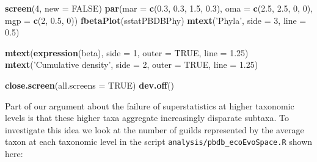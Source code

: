 \documentclass[]{article}
\newenvironment{Shaded}{\begin{snugshade}}{\end{snugshade}}
\newcommand{\KeywordTok}[1]{\textcolor[rgb]{0.13,0.29,0.53}{\textbf{#1}}}
\newcommand{\DataTypeTok}[1]{\textcolor[rgb]{0.13,0.29,0.53}{#1}}
\newcommand{\DecValTok}[1]{\textcolor[rgb]{0.00,0.00,0.81}{#1}}
\newcommand{\FloatTok}[1]{\textcolor[rgb]{0.00,0.00,0.81}{#1}}
\newcommand{\StringTok}[1]{\textcolor[rgb]{0.31,0.60,0.02}{#1}}
\newcommand{\OtherTok}[1]{\textcolor[rgb]{0.56,0.35,0.01}{#1}}
\newcommand{\NormalTok}[1]{#1}
\begin{document}
\begin{Shaded}
\begin{Highlighting}[]
\KeywordTok{screen}\NormalTok{(}\DecValTok{4}\NormalTok{, }\DataTypeTok{new =} \OtherTok{FALSE}\NormalTok{)}
\KeywordTok{par}\NormalTok{(}\DataTypeTok{mar =} \KeywordTok{c}\NormalTok{(}\FloatTok{0.3}\NormalTok{, }\FloatTok{0.3}\NormalTok{, }\FloatTok{1.5}\NormalTok{, }\FloatTok{0.3}\NormalTok{), }\DataTypeTok{oma =} \KeywordTok{c}\NormalTok{(}\FloatTok{2.5}\NormalTok{, }\FloatTok{2.5}\NormalTok{, }\DecValTok{0}\NormalTok{, }\DecValTok{0}\NormalTok{), }
    \DataTypeTok{mgp =} \KeywordTok{c}\NormalTok{(}\DecValTok{2}\NormalTok{, }\FloatTok{0.5}\NormalTok{, }\DecValTok{0}\NormalTok{))}
\KeywordTok{fbetaPlot}\NormalTok{(sstatPBDBPhy)}
\KeywordTok{mtext}\NormalTok{(}\StringTok{'Phyla'}\NormalTok{, }\DataTypeTok{side =} \DecValTok{3}\NormalTok{, }\DataTypeTok{line =} \FloatTok{0.5}\NormalTok{)}

\KeywordTok{mtext}\NormalTok{(}\KeywordTok{expression}\NormalTok{(beta), }\DataTypeTok{side =} \DecValTok{1}\NormalTok{, }\DataTypeTok{outer =} \OtherTok{TRUE}\NormalTok{, }\DataTypeTok{line =} \FloatTok{1.25}\NormalTok{)}
\KeywordTok{mtext}\NormalTok{(}\StringTok{'Cumulative density'}\NormalTok{, }\DataTypeTok{side =} \DecValTok{2}\NormalTok{, }\DataTypeTok{outer =} \OtherTok{TRUE}\NormalTok{, }\DataTypeTok{line =} \FloatTok{1.25}\NormalTok{)}

\KeywordTok{close.screen}\NormalTok{(}\DataTypeTok{all.screens =} \OtherTok{TRUE}\NormalTok{)}
\KeywordTok{dev.off}\NormalTok{()}
\end{Highlighting}
\end{Shaded}

Part of our argument about the failure of superstatistics at higher
taxonomic levels is that these higher taxa aggregate increasingly
disparate subtaxa. To investigate this idea we look at the number of
guilds represented by the average taxon at each taxonomic level in the
script \texttt{analysis/pbdb\_ecoEvoSpace.R} shown here:
\end{document}
